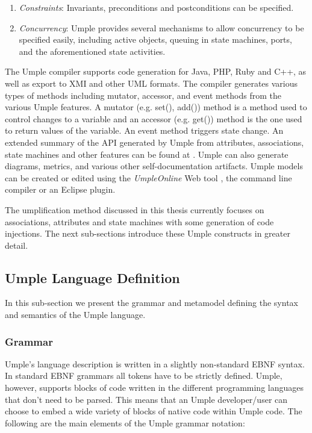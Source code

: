 \begin{enumerate}
 \item 	\textit{Constraints}: Invariants, preconditions and postconditions can be specified.

 \item 	\textit{Concurrency}: Umple provides several mechanisms to allow concurrency to be specified easily, including active objects, queuing in state machines, ports, and the aforementioned state activities.
\end{enumerate}

The Umple compiler supports code generation for Java, PHP, Ruby and C++, as well as export to XMI and other UML formats. The compiler generates various types of methods including mutator, accessor, and event methods from the various Umple features. A mutator (e.g. set(), add()) method is a method used to control changes to a variable and an accessor (e.g. get()) method is the one used to return values of the variable. An event method triggers state change. An extended summary of the API generated by Umple from attributes, associations, state machines and other features can be found at \cite{UmpleAPI}. Umple can also generate diagrams, metrics, and various other self-documentation artifacts. Umple models can be created or edited using the \textit{UmpleOnline} Web tool \cite{UmpleOnline}, the command line compiler or an Eclipse plugin. 

The umplification method discussed in this thesis currently focuses on associations,  attributes and state machines with some generation of code injections. The next sub-sections introduce these Umple constructs in greater detail.

\subsection{Umple Language Definition}
In this sub-section we present the grammar and metamodel defining the syntax and semantics of the Umple language. 

\subsubsection{Grammar}

Umple's language description is written in a slightly non-standard EBNF syntax. In standard EBNF grammars all tokens have to be strictly defined. Umple, however, supports blocks of code written in the different programming languages that don't need to be parsed. This means that an Umple developer/user can choose to embed a wide variety of blocks of native code within Umple code. The following are the main elements of the Umple grammar notation:

